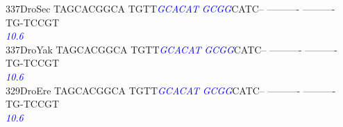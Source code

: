 \documentclass[11pt,twoside,reqno,a4paper]{article}
\begin{document}
{337\hspace*{1\charwidth}DroSec	TAGCACGGCA	TGTT\textit{\textcolor{blue}{G}}\textit{\textcolor{blue}{C}}\textit{\textcolor{blue}{A}}\textit{\textcolor{blue}{C}}\textit{\textcolor{blue}{A}}\textit{\textcolor{blue}{T}}	\textit{\textcolor{blue}{G}}\textit{\textcolor{blue}{C}}\textit{\textcolor{blue}{G}}\textit{\textcolor{blue}{G}}CATC--	----------	----------	TG-TCCGT\\
\hspace*{4\charwidth}\hspace*{7\charwidth}\hspace*{1\charwidth}\hspace*{14\charwidth}\textit{\textcolor{blue}{10.6}}\hspace*{1\charwidth}\hspace*{1\charwidth}\hspace*{1\charwidth}\hspace*{1\charwidth}\\
337\hspace*{1\charwidth}DroYak	TAGCACGGCA	TGTT\textit{\textcolor{blue}{G}}\textit{\textcolor{blue}{C}}\textit{\textcolor{blue}{A}}\textit{\textcolor{blue}{C}}\textit{\textcolor{blue}{A}}\textit{\textcolor{blue}{T}}	\textit{\textcolor{blue}{G}}\textit{\textcolor{blue}{C}}\textit{\textcolor{blue}{G}}\textit{\textcolor{blue}{G}}CATC--	----------	----------	TG-TCCGT\\
\hspace*{4\charwidth}\hspace*{7\charwidth}\hspace*{1\charwidth}\hspace*{14\charwidth}\textit{\textcolor{blue}{10.6}}\hspace*{1\charwidth}\hspace*{1\charwidth}\hspace*{1\charwidth}\hspace*{1\charwidth}\\
329\hspace*{1\charwidth}DroEre	TAGCACGGCA	TGTT\textit{\textcolor{blue}{G}}\textit{\textcolor{blue}{C}}\textit{\textcolor{blue}{A}}\textit{\textcolor{blue}{C}}\textit{\textcolor{blue}{A}}\textit{\textcolor{blue}{T}}	\textit{\textcolor{blue}{G}}\textit{\textcolor{blue}{C}}\textit{\textcolor{blue}{G}}\textit{\textcolor{blue}{G}}CATC--	----------	----------	TG-TCCGT\\
\hspace*{4\charwidth}\hspace*{7\charwidth}\hspace*{1\charwidth}\hspace*{14\charwidth}\textit{\textcolor{blue}{10.6}}\hspace*{1\charwidth}\hspace*{1\charwidth}\hspace*{1\charwidth}\hspace*{1\charwidth}\\
}
\end{document}
